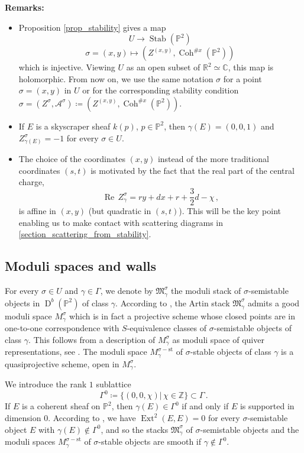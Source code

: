 \documentclass[12pt, a4paper]{amsart}
\newcommand\C{\mathbb C}
\newcommand\PP{\mathbb P}
\newcommand\R{\mathbb R}
\newcommand\Z{\mathbb Z}
\newcommand\cA{\mathcal A}
\newcommand\fM{\mathfrak M}
\newcommand\Coh{\operatorname{Coh}}
\newcommand\Ext{\operatorname{Ext}}
\newcommand\Rea{\operatorname{Re}\,}
\newcommand\Stab{\operatorname{Stab}}
\newcommand\D{\operatorname{D}}
\newcommand\st{\mathrm{st}}
\begin{document}
\textbf{Remarks:}
\begin{itemize}
\item[(i)] Proposition \ref{prop_stability} gives a map 
\[U \rightarrow \Stab(\PP^2)\,\]
\[\sigma=(x,y) \mapsto (Z^{(x,y)}, \Coh^{\texttt{\#}x}(\PP^2))\,\] which is injective.
Viewing $U$ as an open subset of $\R^2 \simeq \C$, this map is holomorphic. From now on, we use the same notation $\sigma$ for a point 
$\sigma=(x,y)$ in $U$ or for the corresponding stability condition 
$\sigma=(Z^\sigma, \cA^\sigma)
\coloneq (Z^{(x,y)}, \Coh^{\texttt{\#}x}(\PP^2))
$.
\item[(ii)] If $E$ is a skyscraper sheaf $k(p)$, $p \in \PP^2$, then 
$\gamma(E)=(0,0,1)$ and $Z_{\gamma(E)}^\sigma=-1$ for every $\sigma \in U$.
\item[(iii)] The choice of the coordinates 
$(x,y)$ instead of the more traditional
coordinates $(s,t)$ is motivated by the fact that the real part of the central charge,
\[ \Rea Z_\gamma^\sigma=ry+dx+r+\frac{3}{2}d -\chi \,, \]
is affine in $(x,y)$ (but quadratic in $(s,t)$). This will be the key point enabling us to make contact with scattering diagrams
in \cref{section_scattering_from_stability}.
\end{itemize}

\subsection{Moduli spaces and walls}

\label{section_moduli_invariants}

For every $\sigma \in U$ and $\gamma \in \Gamma$, we denote by
$\fM_\gamma^\sigma$ the moduli stack of $\sigma$-semistable 
objects in $\D^b(\PP^2)$ of class $\gamma$.
According to \cite{MR3010070}, the Artin stack $\fM_\gamma^\sigma$ admits a good
moduli space $M_\gamma^\sigma$ which is in fact a projective scheme whose
closed points are in one-to-one correspondence with 
$S$-equivalence classes of $\sigma$-semistable objects of class 
$\gamma$. This follows from a description of $M_\gamma^\sigma$
as moduli space of quiver representations,
see  
\cite[Proposition 7.5]{MR3010070}.
The moduli space $M_\gamma^{\sigma-\st}$ of $\sigma$-stable objects of class 
$\gamma$ is a quasiprojective scheme, open in $M_\gamma^\sigma$.


We introduce the rank $1$ sublattice 
\[\Gamma^0 \coloneq \{(0,0,\chi)|\, \chi \in \Z\} \subset \Gamma \,. \] 
If $E$ is a coherent sheaf on $\PP^2$, then 
$\gamma(E) \in \Gamma^0$ if and only if $E$ is supported in dimension $0$.
According to \cite{MR3936077}, we have 
$\Ext^2(E,E)=0$ for every $\sigma$-semistable object $E$ with $\gamma(E) \notin 
\Gamma^0$, and so the stacks
$\fM_\gamma^\sigma$ of $\sigma$-semistable objects and the moduli spaces 
$M_\gamma^{\sigma-\st}$ of $\sigma$-stable objects are smooth if 
$\gamma \notin \Gamma^0$.
\end{document}
